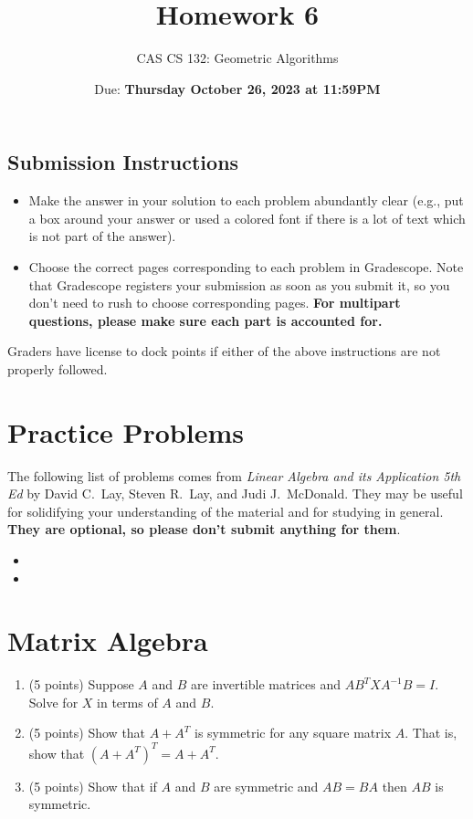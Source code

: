\documentclass{article}
\title{
  Homework 6
}
\author{CAS CS 132: Geometric Algorithms}
\date{Due: \textbf{Thursday October 26, 2023 at 11:59PM}}
\theoremstyle{remark}
\begin{document}
\maketitle

\subsection*{Submission Instructions}
\begin{itemize}
\item Make the answer in your solution to each problem abundantly clear (e.g., put a box around your answer or used a colored font if there is a lot of text which is not part of the answer).
\item Choose the correct pages corresponding to each problem in Gradescope. Note that Gradescope registers your submission as soon as you submit it, so you don't need to rush to choose corresponding pages.
  \textbf{For multipart questions, please make sure each part is accounted for.}
\end{itemize}
Graders have license to dock points if either of the above instructions are not properly followed.


\section*{Practice Problems}

The following list of problems comes from \textit{Linear Algebra and its Application 5th Ed} by David C.\ Lay, Steven R.\ Lay, and Judi J.\ McDonald.
They may be useful for solidifying your understanding of the material and for studying in general.
\textbf{They are optional, so please don't submit anything for them}.

\begin{itemize}
\item
\item
\end{itemize}

\pagebreak
\section{Matrix Algebra}

\begin{enumerate}
\item (5 points) Suppose $A$ and $B$ are invertible matrices and $AB^TXA^{-1}B = I$. Solve for $X$ in terms of $A$ and $B$.
\item (5 points) Show that $A + A^T$ is symmetric for any square matrix $A$. That is, show that $(A + A^T)^T = A + A^T$.
\item (5 points) Show that if $A$ and $B$ are symmetric and $AB = BA$ then $AB$ is symmetric.
\end{enumerate}
\end{document}
